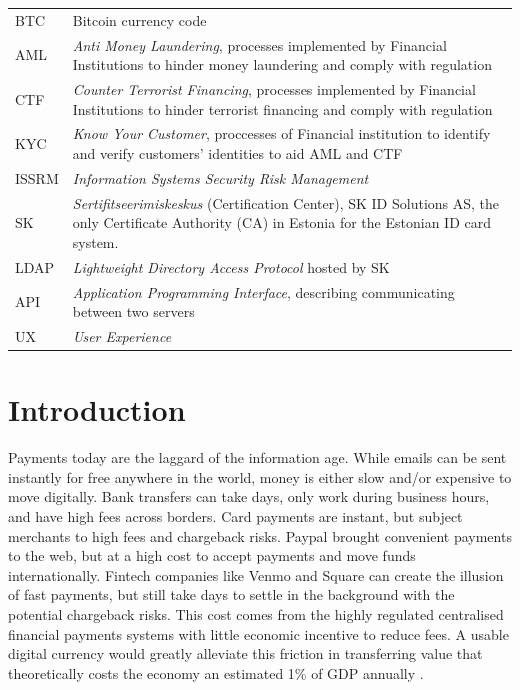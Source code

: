 \documentclass[12pt]{article} %
\begin{document}
\begin{tabular}{p{3 cm} p{10cm}}
	BTC & Bitcoin currency code\\
	AML & \textit{Anti Money Laundering}, processes implemented by Financial Institutions to hinder money laundering and comply with regulation\\
	CTF & \textit{Counter Terrorist Financing}, processes implemented by Financial Institutions to hinder terrorist financing and comply with regulation\\
	KYC & \textit{Know Your Customer}, proccesses of Financial institution to identify and verify customers' identities to aid AML and CTF\\
	ISSRM & \textit{Information Systems Security Risk Management} \\
	SK & \textit{Sertifitseerimiskeskus} (Certification Center), SK ID Solutions AS, the only Certificate Authority (CA) in Estonia for the Estonian ID card system. \\
	LDAP & \textit{Lightweight Directory Access Protocol} hosted by SK \\
	API & \textit{Application Programming Interface}, describing communicating between two servers \\
	UX & \textit{User Experience}
\end{tabular}

\pagebreak

\tableofcontents
\newpage

\listoffigures
\pagebreak

\listoftables
\pagebreak

\section{Introduction} \label{sec:1}

Payments today are the laggard of the information age. While emails can be sent instantly for free anywhere in the world, money is either slow and/or expensive to move digitally. Bank transfers can take days, only work during business hours, and have high fees across borders. Card payments are instant, but subject merchants to high fees and chargeback risks. Paypal brought convenient payments to the web, but at a high cost to accept payments and move funds internationally. Fintech companies like Venmo and Square can create the illusion of fast payments, but still take days to settle in the background with the potential chargeback risks. This cost comes from the highly regulated centralised financial payments systems with little economic incentive to reduce fees. A usable digital currency would greatly alleviate this friction in transferring value that theoretically costs the economy an estimated 1\% of GDP annually \cite{kaarmann2013cost}.
\end{document}

